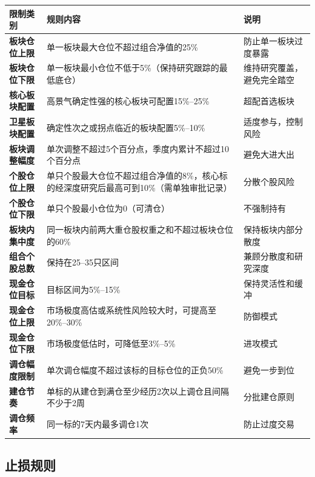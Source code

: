 \begin{exhibitbox}[表9-22：组合仓位限制规则汇总]
\scriptsize
\setlength{\tabcolsep}{3pt}
\renewcommand{\arraystretch}{1.12}
\begin{tabularx}{\textwidth}{l X l}
\toprule
\textbf{限制类别} & \textbf{规则内容} & \textbf{说明} \\
\midrule
\textbf{板块仓位上限} & 单一板块最大仓位不超过组合净值的25\% & 防止单一板块过度暴露 \\
\textbf{板块仓位下限} & 单一板块最小仓位不低于5\%（保持研究跟踪的最低底仓） & 维持研究覆盖，避免完全踏空 \\
\textbf{核心板块配置} & 高景气确定性强的核心板块可配置15\%--25\% & 超配首选板块 \\
\textbf{卫星板块配置} & 确定性次之或拐点临近的板块配置5\%--10\% & 适度参与，控制风险 \\
\textbf{板块调整幅度} & 单次调整不超过5个百分点，季度内累计不超过10个百分点 & 避免大进大出 \\
\midrule
\textbf{个股仓位上限} & 单只个股最大仓位不超过组合净值的8\%，核心标的经深度研究后最高可到10\%（需单独审批记录） & 分散个股风险 \\
\textbf{个股仓位下限} & 单只个股最小仓位为0（可清仓） & 不强制持有 \\
\textbf{板块内集中度} & 同一板块内前两大重仓股权重之和不超过板块仓位的60\% & 保持板块内部分散度 \\
\textbf{组合个股总数} & 保持在25--35只区间 & 兼顾分散度和研究深度 \\
\midrule
\textbf{现金仓位目标} & 目标区间为5\%--15\% & 保持灵活性和缓冲 \\
\textbf{现金仓位上限} & 市场极度高估或系统性风险较大时，可提高至20\%--30\% & 防御模式 \\
\textbf{现金仓位下限} & 市场极度低估时，可降低至3\%--5\% & 进攻模式 \\
\midrule
\textbf{调仓幅度限制} & 单次调仓幅度不超过该标的目标仓位的正负50\% & 避免一步到位 \\
\textbf{建仓节奏} & 单标的从建仓到满仓至少经历2次以上调仓且间隔不少于2周 & 分批建仓原则 \\
\textbf{调仓频率} & 同一标的7天内最多调仓1次 & 防止过度交易 \\
\bottomrule
\end{tabularx}
\end{exhibitbox}

\subsection{止损规则}

